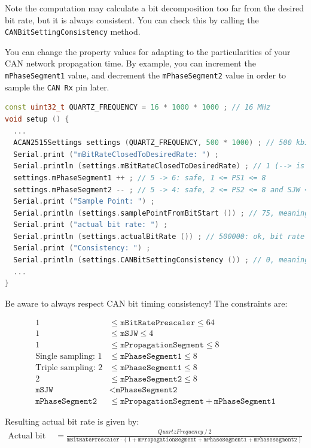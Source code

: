 \documentclass[9pt, a4paper, obeyspaces]{extarticle}
\begin{document}
Note the computation may calculate a bit decomposition too far from the desired bit rate, but it is always consistent. You can check this by calling the \texttt{CANBitSettingConsistency} method.

You can change the property values for adapting to the particularities of your CAN network propagation time. By example, you can increment the \texttt{mPhaseSegment1} value, and decrement the \texttt{mPhaseSegment2} value in order to sample the \texttt{CAN Rx} pin later.

{ \small\begin{lstlisting}[language=c++]
const uint32_t QUARTZ_FREQUENCY = 16 * 1000 * 1000 ; // 16 MHz
void setup () {
  ...
  ACAN2515Settings settings (QUARTZ_FREQUENCY, 500 * 1000) ; // 500 kbit/s
  Serial.print ("mBitRateClosedToDesiredRate: ") ;
  Serial.println (settings.mBitRateClosedToDesiredRate) ; // 1 (--> is true)
  settings.mPhaseSegment1 ++ ; // 5 -> 6: safe, 1 <= PS1 <= 8
  settings.mPhaseSegment2 -- ; // 5 -> 4: safe, 2 <= PS2 <= 8 and SJW <= PS2
  Serial.print ("Sample Point: ") ;
  Serial.println (settings.samplePointFromBitStart ()) ; // 75, meaning 75%
  Serial.print ("actual bit rate: ") ;
  Serial.println (settings.actualBitRate ()) ; // 500000: ok, bit rate did not change
  Serial.print ("Consistency: ") ;
  Serial.println (settings.CANBitSettingConsistency ()) ; // 0, meaning Ok
  ...
}
\end{lstlisting}}

Be aware to always respect CAN bit timing consistency! The constraints are:

\begin{align*}
1 & \leqslant \texttt{mBitRatePrescaler} \leqslant 64 \\
1 & \leqslant \texttt{mSJW} \leqslant 4 \\
1 & \leqslant \texttt{mPropagationSegment} \leqslant 8 \\
\text{Single sampling: }1 & \leqslant \texttt{mPhaseSegment1} \leqslant 8\\
\text{Triple sampling: }2 & \leqslant \texttt{mPhaseSegment1} \leqslant 8\\
2 & \leqslant \texttt{mPhaseSegment2} \leqslant 8 \\
\texttt{mSJW} &<\texttt{mPhaseSegment2}\\
\texttt{mPhaseSegment2} & \leqslant \texttt{mPropagationSegment} + \texttt{mPhaseSegment1}
\end{align*}

Resulting actual bit rate is given by:
{\small
\begin{align*}
\text{Actual bit rate} & = \frac{QuartzFrequency~/~2}{\texttt{mBitRatePrescaler} \cdot (1 + \texttt{mPropagationSegment} + \texttt{mPhaseSegment1} + \texttt{mPhaseSegment2})}
\end{align*}
}
\end{document}
